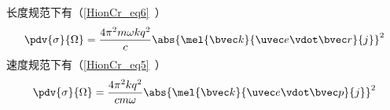 长度规范下有（\autoref{HionCr_eq6}~）
\begin{equation}
\pdv{\sigma}{\Omega} = \frac{4\pi^2 m\omega k q^2}{c} \abs{\mel{\bvec k}{\uvec e \vdot\bvec r}{j}}^2
\end{equation}
速度规范下有（\autoref{HionCr_eq5}~）
\begin{equation}\label{SIcros_eq8} %
\pdv{\sigma}{\Omega} = \frac{4\pi^2 k q^2}{c m \omega} \abs{\mel{\bvec k}{\uvec e \vdot \bvec p}{j}}^2
\end{equation}
